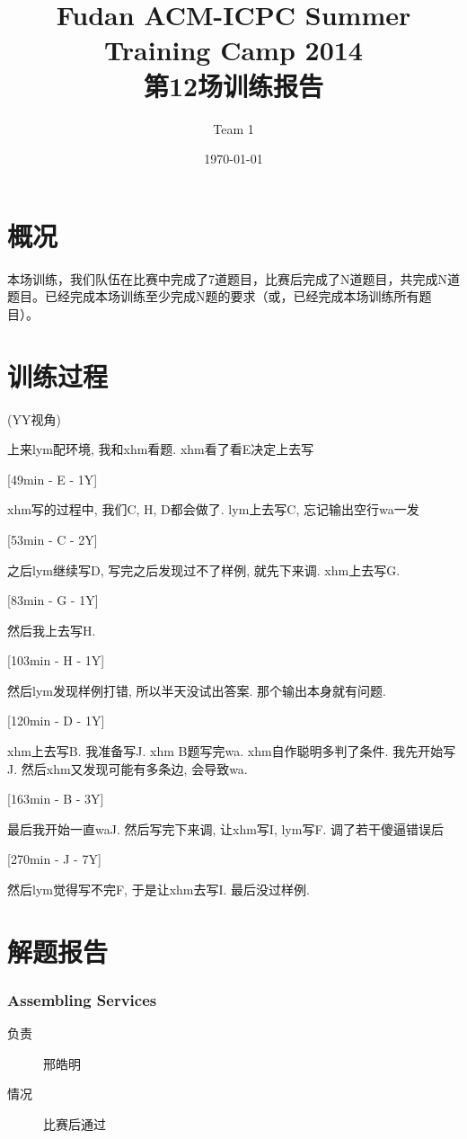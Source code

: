 \documentclass[a4paper, 11pt, nofonts, nocap, fancyhdr]{ctexart}
\title{Fudan ACM-ICPC Summer Training Camp 2014\\第12场训练报告}
\author{Team 1}
\date{\today}
\newcommand{\problem}[1]{\subsubsection{#1}}
\begin{document}
\maketitle

\section{概况}

本场训练，我们队伍在比赛中完成了7道题目，比赛后完成了N道题目，共完成N道题目。已经完成本场训练至少完成N题的要求（或，已经完成本场训练所有题目）。

\section{训练过程}

(YY视角)

上来lym配环境, 我和xhm看题.	xhm看了看E决定上去写

[49min - E - 1Y]

xhm写的过程中, 我们C, H, D都会做了. lym上去写C, 忘记输出空行wa一发

[53min - C - 2Y]

之后lym继续写D, 写完之后发现过不了样例, 就先下来调. xhm上去写G. 

[83min - G - 1Y]

然后我上去写H.

[103min - H - 1Y]

然后lym发现样例打错, 所以半天没试出答案. 那个输出本身就有问题.

[120min - D - 1Y]

xhm上去写B. 我准备写J. xhm B题写完wa. xhm自作聪明多判了条件. 我先开始写J. 然后xhm又发现可能有多条边, 会导致wa.

[163min - B - 3Y]

最后我开始一直waJ. 然后写完下来调, 让xhm写I, lym写F. 调了若干傻逼错误后

[270min - J - 7Y]

然后lym觉得写不完F, 于是让xhm去写I. 最后没过样例.

\section{解题报告}

\problem{Assembling Services}

\begin{description}
\item[负责] 邢皓明
\item[情况] 比赛后通过
\end{description}
\end{document}
